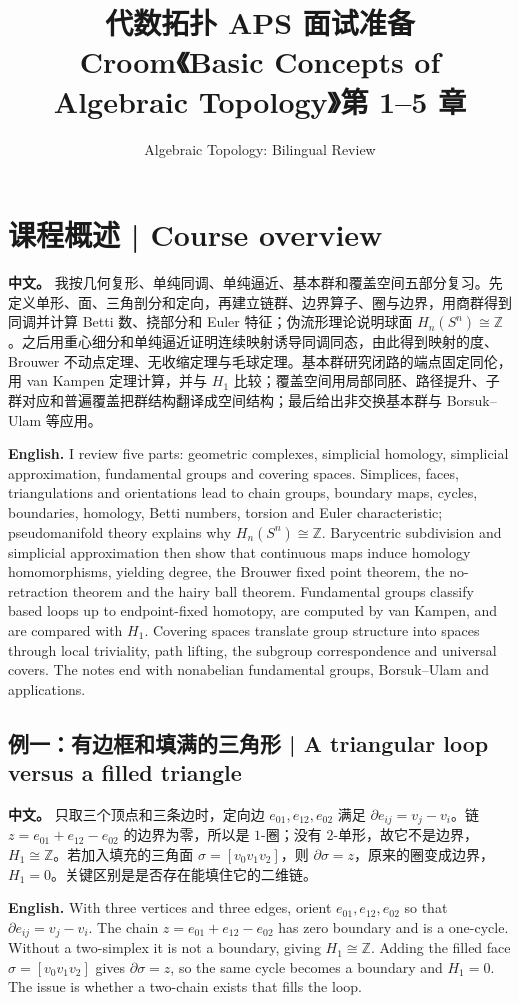 \documentclass[UTF8,11pt,a4paper]{ctexart}
\title{代数拓扑 APS 面试准备\\[4pt]\large Croom《Basic Concepts of Algebraic Topology》第 1--5 章}
\author{Algebraic Topology: Bilingual Review}
\date{}
\newcommand{\APS}[2]{\par\noindent\textbf{中文。} #1\par\noindent\textbf{English.} #2\par\smallskip}
\begin{document}
\maketitle

\section*{课程概述 | Course overview}
\APS{我按几何复形、单纯同调、单纯逼近、基本群和覆盖空间五部分复习。先定义单形、面、三角剖分和定向，再建立链群、边界算子、圈与边界，用商群得到同调并计算 Betti 数、挠部分和 Euler 特征；伪流形理论说明球面 $H_n(S^n)\cong\mathbb Z$。之后用重心细分和单纯逼近证明连续映射诱导同调同态，由此得到映射的度、Brouwer 不动点定理、无收缩定理与毛球定理。基本群研究闭路的端点固定同伦，用 van Kampen 定理计算，并与 $H_1$ 比较；覆盖空间用局部同胚、路径提升、子群对应和普遍覆盖把群结构翻译成空间结构；最后给出非交换基本群与 Borsuk--Ulam 等应用。}{I review five parts: geometric complexes, simplicial homology, simplicial approximation, fundamental groups and covering spaces. Simplices, faces, triangulations and orientations lead to chain groups, boundary maps, cycles, boundaries, homology, Betti numbers, torsion and Euler characteristic; pseudomanifold theory explains why $H_n(S^n)\cong\mathbb Z$. Barycentric subdivision and simplicial approximation then show that continuous maps induce homology homomorphisms, yielding degree, the Brouwer fixed point theorem, the no-retraction theorem and the hairy ball theorem. Fundamental groups classify based loops up to endpoint-fixed homotopy, are computed by van Kampen, and are compared with $H_1$. Covering spaces translate group structure into spaces through local triviality, path lifting, the subgroup correspondence and universal covers. The notes end with nonabelian fundamental groups, Borsuk--Ulam and applications.}
\subsection*{例一：有边框和填满的三角形 | A triangular loop versus a filled triangle}
\APS{只取三个顶点和三条边时，定向边 $e_{01},e_{12},e_{02}$ 满足 $\partial e_{ij}=v_j-v_i$。链 $z=e_{01}+e_{12}-e_{02}$ 的边界为零，所以是 $1$-圈；没有 $2$-单形，故它不是边界，$H_1\cong\mathbb Z$。若加入填充的三角面 $\sigma=[v_0v_1v_2]$，则 $\partial\sigma=z$，原来的圈变成边界，$H_1=0$。关键区别是是否存在能填住它的二维链。}{With three vertices and three edges, orient $e_{01},e_{12},e_{02}$ so that $\partial e_{ij}=v_j-v_i$. The chain $z=e_{01}+e_{12}-e_{02}$ has zero boundary and is a one-cycle. Without a two-simplex it is not a boundary, giving $H_1\cong\mathbb Z$. Adding the filled face $\sigma=[v_0v_1v_2]$ gives $\partial\sigma=z$, so the same cycle becomes a boundary and $H_1=0$. The issue is whether a two-chain exists that fills the loop.}
\end{document}
